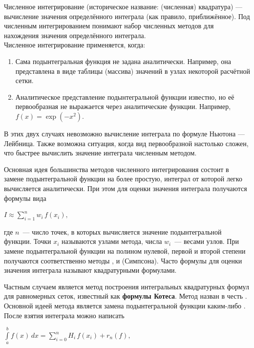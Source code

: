 \documentclass[a4paper]{article}
\begin{document}
{{{{{{{{Численное интегрирование (историческое название: (численная) квадратура) — вычисление значения определённого интеграла (как правило, приближённое). Под численным интегрированием понимают набор численных методов для нахождения значения определённого интеграла.\\

Численное интегрирование применяется, когда:\\

\begin{enumerate}
\item
  Сама подынтегральная функция не задана аналитически. Например, она
  представлена в виде таблицы (массива) значений в узлах некоторой
  расчётной сетки.
\item
  Аналитическое представление подынтегральной функции известно, но её
  первообразная не выражается через аналитические функции. Например,
  {{\(f(x) = \exp( - x^{2})\)}}.
\end{enumerate}

В этих двух случаях невозможно вычисление интеграла по формуле Ньютона — Лейбница. Также возможна ситуация, когда вид первообразной настолько сложен, что быстрее вычислить значение интеграла численным методом.

Основная идея большинства методов численного интегрирования состоит в
замене подынтегральной функции на более простую, интеграл от которой
легко вычисляется аналитически. При этом для оценки значения интеграла
получаются формулы вида

\begin{center}
 {{\(I \approx \sum\limits_{i = 1}^{n}w_{i}\, f(x_{i}),\)}}
\end{center}

где {{\(n\)}}~--- число точек, в которых вычисляется значение
подынтегральной функции. Точки {{\(x_{i}\)}} называются узлами метода,
числа {{\(w_{i}\)}}~--- весами узлов. При замене подынтегральной функции
на полином нулевой, первой и второй степени получаются соответственно
методы , и (Симпсона). Часто формулы для оценки значения интеграла
называют квадратурными формулами.

Частным случаем является метод построения интегральных квадратурных
формул для равномерных сеток, известный как \textbf{формулы Котеса}.
Метод назван в честь . Основной идеей метода является замена
подынтегральной функции каким-либо . После взятия интеграла можно
написать

\begin{center}
 {{\(\int\limits_{a}^{b}f(x)\, dx = \sum\limits_{i = 0}^{n}H_{i}\, f(x_{i}) + r_{n}(f),\)}}
\end{center}

}}}}}}}}
\end{document}
